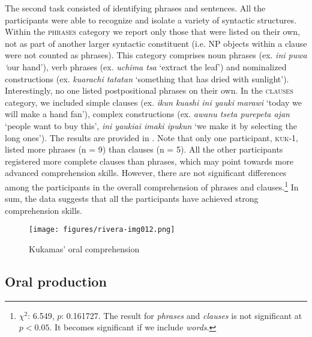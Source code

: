 \documentclass[output=paper]{langscibook}
\begin{document}
The second task consisted of identifying phrases and sentences. All the participants were able to recognize and isolate a variety of syntactic structures. Within the \textsc{phrases} category we report only those that were listed on their own, not as part of another larger syntactic constituent (i.e. NP objects within a clause were not counted as phrases). This category comprises noun phrases (ex. \textit{ini puwa ‘}our hand’), verb phrases (ex. \textit{uchima tsa} ‘extract the leaf’) and nominalized constructions (ex. \textit{kuarachi tatatan} ‘something that has dried with sunlight’). Interestingly, no one listed postpositional phrases on their own. In the \textsc{clauses} category, we included simple clauses (ex. \textit{ikun kuashi ini yauki} \textit{marawi} ‘today we will make a hand fan’), complex constructions (ex. \textit{awanu tseta purepeta ajan} ‘people want to buy this’, \textit{ini yaukiai imaki ipukun} ‘we make it by selecting the long ones’). The results are provided in . Note that only one participant, \textsc{kuk}{}-1, listed more phrases (n = 9) than clauses (n = 5). All the other participants registered more complete clauses than phrases, which may point towards more advanced comprehension skills. However, there are not significant differences among the participants in the overall comprehension of phrases and clauses.\footnote{$\chi^2$: 6.549, $p$: 0.161727. The result for \textit{phrases} and \textit{clauses} is not significant at $p< 0.05$. It becomes significant if we include \textit{words}.} In sum, the data suggests that all the participants have achieved strong comprehension skills.

\begin{figure}
\caption{Kukamas’ oral comprehension}
\label{fig:7:2}
\texttt{[image: figures/rivera-img012.png]}
\end{figure}

\subsection{{{Oral production}}}
\end{document}
